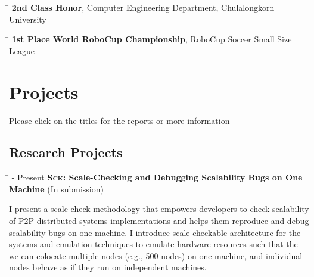 \documentclass[10pt]{article} %
\begin{document}
\begin{tabbing}
\hspace{2.5cm} \=  \> \textbf{2nd Class Honor}, Computer Engineering Department, Chulalongkorn University
\end{tabbing}

\begin{tabbing}
\hspace{2.5cm} \=  \> \textbf{1st Place World RoboCup Championship}, RoboCup Soccer Small Size League
\end{tabbing}

\pagebreak


\section{Projects}
\vspace{-4mm}
{\footnotesize Please click on the titles for the reports or more information}

\subsection{Research Projects}

\begin{tabbing}
\hspace{2.5cm} \=  - Present \>\+ \textbf{\textsc{Sck}: Scale-Checking and Debugging Scalability Bugs on One Machine} (In submission) \\
\begin{minipage}{\smallertextwidth}
I present a scale-check methodology that empowers developers to check
scalability of P2P distributed systems implementations and helps them reproduce
and debug scalability bugs on one machine. I introduce scale-checkable
architecture for the systems and emulation techniques to emulate hardware
resources such that the we can colocate multiple nodes (e.g., 500 nodes) on one
machine, and individual nodes behave as if they run on independent machines.
\end{minipage}
\end{tabbing}
\end{document}
